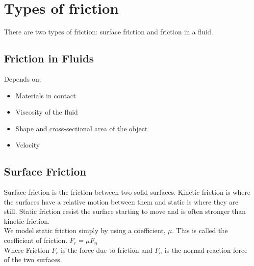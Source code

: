 \documentclass[class=article, crop=false]{standalone}
\begin{document}
\section*{Types of friction}
There are two types of friction: surface friction and friction in a fluid.
\subsection*{Friction in Fluids}
Depends on:
\begin{itemize}
	\item Materials in contact
	\item Viscosity of the fluid
	\item Shape and cross-sectional area of the object
	\item Velocity
\end{itemize}
\subsection*{Surface Friction} 
Surface friction is the friction between two solid surfaces. Kinetic friction is where the surfaces have a relative motion between them and static is where they are still. Static friction resist the surface starting to move and is often stronger than kinetic friction. \\
We model static friction simply by using a coefficient, $\mu$. This is called the coefficient of friction. 
$F_r = \mu F_n$ \\
Where Friction $F_r$ is the force due to friction and $F_n$ is the normal reaction force of the two surfaces. 
\end{document}
